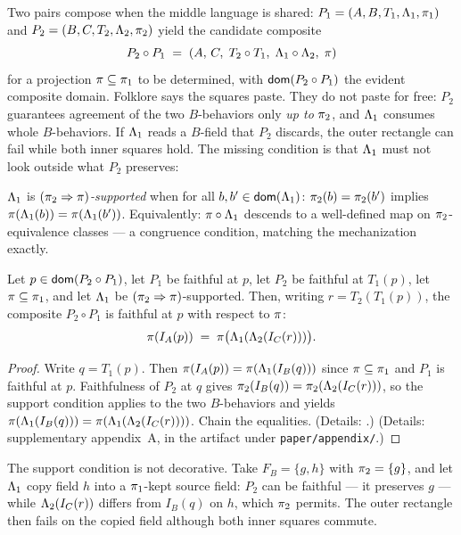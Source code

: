 Two pairs compose when the middle language is shared:
$P_1 = (A, B, T_1, \Lambda_1, \pi_1)$ and
$P_2 = (B, C, T_2, \Lambda_2, \pi_2)$ yield the candidate composite
\[
P_2 \circ P_1 \;=\; (A,\, C,\; T_2 \circ T_1,\; \Lambda_1 \circ \Lambda_2,\;
\pi)
\]
for a projection $\pi \subseteq \pi_1$ to be determined, with
$\mathsf{dom}(P_2 \circ P_1)$ the evident composite domain. Folklore says the
squares paste. They do not paste for free: $P_2$ guarantees agreement of
the two $B$-behaviors only \emph{up to} $\pi_2$, and $\Lambda_1$ consumes
whole $B$-behaviors. If $\Lambda_1$ reads a $B$-field that $P_2$ discards,
the outer rectangle can fail while both inner squares hold. The missing
condition is that $\Lambda_1$ must not look outside what $P_2$ preserves:

\begin{definition}[Support]
\label{def:support}
$\Lambda_1$ is \emph{$(\pi_2 \Rightarrow \pi)$-supported} when for all
$b, b' \in \mathsf{dom}(\Lambda_1)$:
$\pi_2(b) = \pi_2(b')$ implies
$\pi(\Lambda_1(b)) = \pi(\Lambda_1(b'))$.
Equivalently: $\pi \circ \Lambda_1$ descends to a well-defined map on
$\pi_2$-equivalence classes --- a congruence condition, matching the
mechanization exactly.
\end{definition}

\begin{theorem}[Pasting]
\label{thm:pasting}
Let $p \in \mathsf{dom}(P_2 \circ P_1)$, let $P_1$ be faithful at $p$, let $P_2$
be faithful at $T_1(p)$, let $\pi \subseteq \pi_1$, and let
$\Lambda_1$ be $(\pi_2 \Rightarrow \pi)$-supported. Then, writing
$r = T_2(T_1(p))$, the composite $P_2 \circ P_1$ is faithful at $p$ with
respect to $\pi$:
\[
\pi(I_A(p)) \;=\; \pi\bigl(\Lambda_1(\Lambda_2(I_C(r)))\bigr).
\]
\end{theorem}

\begin{proof}
Write $q = T_1(p)$. Then $\pi(I_A(p)) = \pi(\Lambda_1(I_B(q)))$ since
$\pi \subseteq \pi_1$ and $P_1$ is faithful at $p$. Faithfulness of
$P_2$ at $q$ gives
$\pi_2(I_B(q)) = \pi_2(\Lambda_2(I_C(r)))$, so the
support condition applies to the two $B$-behaviors and yields
$\pi(\Lambda_1(I_B(q))) = \pi(\Lambda_1(\Lambda_2(I_C(r))))$.
Chain the equalities.
\ifarxiv (Details: .)
\else (Details: supplementary appendix~A, in the
artifact under \texttt{paper/appendix/}.)
\fi
\end{proof}

The support condition is not decorative. Take $F_B = \{g, h\}$ with
$\pi_2 = \{g\}$, and let $\Lambda_1$ copy field $h$ into a
$\pi_1$-kept source field: $P_2$ can be faithful --- it preserves
$g$ --- while $\Lambda_2(I_C(r))$ differs from $I_B(q)$ on $h$, which
$\pi_2$ permits. The outer rectangle then fails on the copied field
although both inner squares commute.

